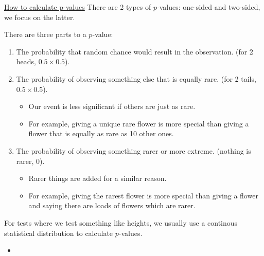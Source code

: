 \documentclass[12pt, titlepage, french]{report}
\begin{document}
\begin{YTB_SUMM_AUTO_NUMB}[label = {SQ-p-val-calc}]{\href{https://www.youtube.com/watch?v=JQc3yx0-Q9E&feature=youtu.be}{How to calculate p-values}}
There are 2 types of $p$-values: one-sided and two-sided, we focus on the latter.

There are three parts to a $p$-value:
\begin{enumerate}
	\item	The probability that random chance would result in the observation. (for 2 heads, $0.5 \times 0.5$).
	\item	The probability of observing something else that is equally rare. (for 2 tails, $0.5 \times 0.5$).
		\begin{itemize}
		\item	Our event is less significant if others are just as rare.
		\item	For example, giving a unique rare flower is more special than giving a flower that is equally as rare as 10 other ones.
		\end{itemize}
	\item	The probability of observing something rarer or more extreme. (nothing is rarer, $0$).
		\begin{itemize}
		\item	Rarer things are added for a similar reason.
		\item	For example, giving the rarest flower is more special than giving a flower and saying there are loads of flowers which are rarer.
		\end{itemize}
\end{enumerate}

For tests where we test something like heights, we usually use a continous statistical distribution to calculate $p$-values.
\begin{itemize}[leftmargin = *]
	\item	
\end{itemize}
\end{YTB_SUMM_AUTO_NUMB}
\end{document}
